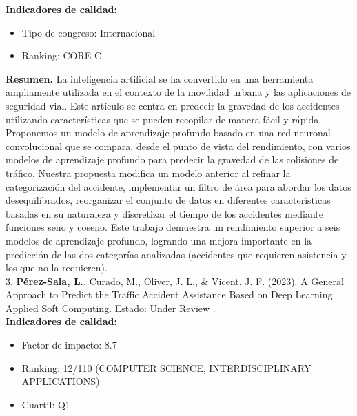 \documentclass{uathesis-es}
\begin{document}
{\textbf{Indicadores de calidad:} 
\begin{itemize}
    \item Tipo de congreso: Internacional
    \item Ranking: CORE C
\end{itemize}

\textbf{Resumen.} La inteligencia artificial se ha convertido en una herramienta ampliamente utilizada en el contexto de la movilidad urbana y las aplicaciones de seguridad vial. Este artículo se centra en predecir la gravedad de los accidentes utilizando características que se pueden recopilar de manera fácil y rápida. Proponemos un modelo de aprendizaje profundo basado en una red neuronal convolucional que se compara, desde el punto de vista del rendimiento, con varios modelos de aprendizaje profundo para predecir la gravedad de las colisiones de tráfico. Nuestra propuesta modifica un modelo anterior al refinar la categorización del accidente, implementar un filtro de área para abordar los datos desequilibrados, reorganizar el conjunto de datos en diferentes características basadas en su naturaleza y discretizar el tiempo de los accidentes mediante funciones seno y coseno. Este trabajo demuestra un rendimiento superior a seis modelos de aprendizaje profundo, logrando una mejora importante en la predicción de las dos categorías analizadas (accidentes que requieren asistencia y los que no la requieren). \\


3. \textbf{Pérez-Sala, L.}, Curado, M., Oliver, J. L., \& Vicent, J. F. (2023). A General Approach to Predict the Traffic Accident Assistance Based on Deep Learning. Applied Soft Computing. Estado: Under Review .\\

\textbf{Indicadores de calidad:} 
\begin{itemize}
    \item Factor de impacto: 8.7
    \item Ranking: 12/110 (COMPUTER SCIENCE, INTERDISCIPLINARY APPLICATIONS)
    
    \item Cuartil: Q1
\end{itemize}

}
\end{document}
